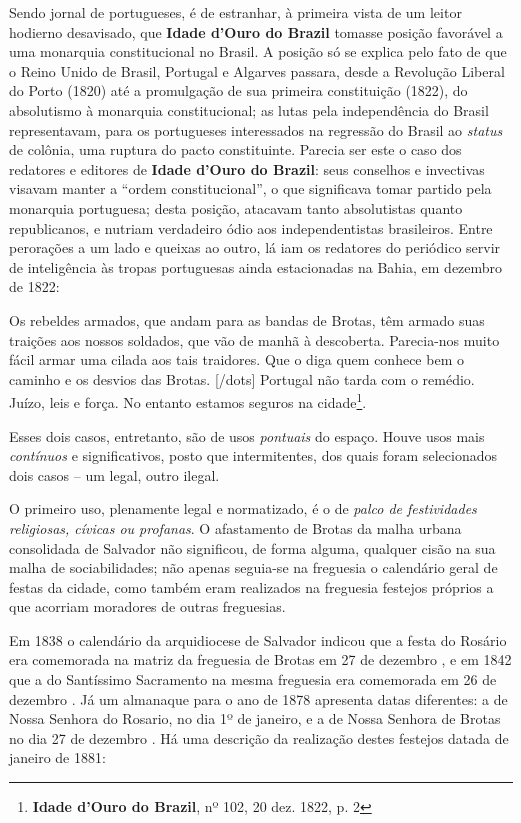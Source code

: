 Sendo jornal de portugueses, é de estranhar, à primeira vista de um leitor hodierno desavisado, que \textbf{Idade d'Ouro do Brazil} tomasse posição favorável a uma monarquia constitucional no Brasil. A posição só se explica pelo fato de que o Reino Unido de Brasil, Portugal e Algarves passara, desde a Revolução Liberal do Porto (1820) até a promulgação de sua primeira constituição (1822), do absolutismo à monarquia constitucional; as lutas pela independência do Brasil representavam, para os portugueses interessados na regressão do Brasil ao \textit{status} de colônia, uma ruptura do pacto constituinte. Parecia ser este o caso dos redatores e editores de \textbf{Idade d'Ouro do Brazil}: seus conselhos e invectivas visavam manter a ``ordem constitucional'', o que significava tomar partido pela monarquia portuguesa; desta posição, atacavam tanto absolutistas quanto republicanos, e nutriam verdadeiro ódio aos independentistas brasileiros. Entre perorações a um lado e queixas ao outro, lá iam os redatores do periódico servir de inteligência às tropas portuguesas ainda estacionadas na Bahia, em dezembro de 1822:

\begin{citacao}
Os rebeldes armados, que andam para as bandas de Brotas, têm armado suas traições aos nossos soldados, que vão de manhã à descoberta. Parecia-nos muito fácil armar uma cilada aos tais traidores. Que o diga quem conhece bem o caminho e os desvios das Brotas. [/dots] Portugal não tarda com o remédio. Juízo, leis e força. No entanto estamos seguros na cidade\footnote{\textbf{Idade d'Ouro do Brazil}, nº 102, 20 dez. 1822, p. 2}.
\end{citacao}

Esses dois casos, entretanto, são de usos \textit{pontuais} do espaço. Houve usos mais \textit{contínuos} e significativos, posto que intermitentes, dos quais foram selecionados dois casos -- um legal, outro ilegal.

O primeiro uso, plenamente legal e normatizado, é o de \textit{palco de festividades religiosas, cívicas ou profanas}. O afastamento de Brotas da malha urbana consolidada de Salvador não significou, de forma alguma, qualquer cisão na sua malha de sociabilidades; não apenas seguia-se na freguesia o calendário geral de festas da cidade, como também eram realizados na freguesia festejos próprios a que acorriam moradores de outras freguesias.

Em 1838 o calendário da arquidiocese de Salvador indicou que a festa do Rosário era comemorada na matriz da freguesia de Brotas em 27 de dezembro \cite[p.~44]{arcebis_diario_1837}, e em 1842 que a do Santíssimo Sacramento na mesma freguesia era comemorada em 26 de dezembro \cite[p.~55]{arcebis_folhinha_1841}. Já um almanaque para o ano de 1878 apresenta datas diferentes: a de Nossa Senhora do Rosario, no dia 1º de janeiro, e a de Nossa Senhora de Brotas no dia 27 de dezembro \cite[pp.~53,~109]{macosta_almana_1877}. Há uma descrição da realização destes festejos datada de janeiro de 1881:

